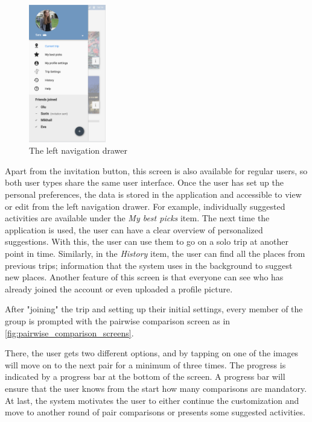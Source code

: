 \documentclass[11pt,a4paper,oneside]{article}
\begin{document}
\begin{figure}[H]
    \centering
    \includegraphics[width=0.3\textwidth]{paper/imgs/hifi_prototypes/left_screen.png}
    \caption{The left navigation drawer}
    \label{fig:left_menu}
\end{figure}


Apart from the invitation button, this screen is also available for regular users, so both user types share the same user interface. Once the user has set up the personal preferences, the data is stored in the application and accessible to view or edit from the left navigation drawer. For example, individually suggested activities are available under the \emph{My best picks} item. The next time the application is used, the user can have a clear overview of personalized suggestions. With this, the user can use them to go on a solo trip at another point in time. Similarly, in the \emph{History} item, the user can find all the places from previous trips; information that the system uses in the background to suggest new places. Another feature of this screen is that everyone can see who has already joined the account or even uploaded a profile picture.

After "joining" the trip and setting up their initial settings, every member of the group is prompted with the pairwise comparison screen as in \autoref{fig:pairwise_comparison_screens}.

There, the user gets two different options, and by tapping on one of the images will move on to the next pair for a minimum of three times. The progress is indicated by a progress bar at the bottom of the screen. A progress bar will ensure that the user knows from the start how many comparisons are mandatory.  At last, the system motivates the user to either continue the customization and move to another round of pair comparisons or presents some suggested activities.
\end{document}
